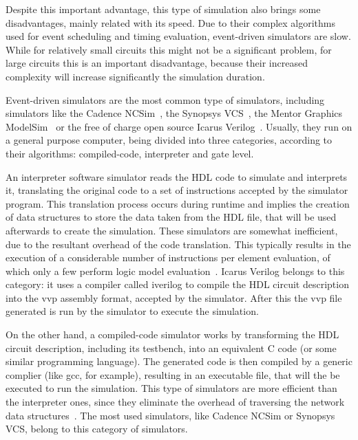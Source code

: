 Despite this important advantage, this type of simulation also brings some
disadvantages, mainly related with its speed. Due to their complex algorithms
used for event scheduling and timing evaluation, event-driven simulators are
slow. While for relatively small circuits this might not be a significant
problem, for large circuits this is an important disadvantage, because their
increased complexity will increase significantly the simulation duration.

Event-driven simulators are the most common type of simulators, including
simulators like the Cadence NCSim~\cite{cadence:ncsim}, the Synopsys
VCS~\cite{synopsys:vcs}, the Mentor Graphics ModelSim~\cite{mentor:modelsim} or
the free of charge open source Icarus Verilog~\cite{icarus:verilog}. Usually,
they run on a general purpose computer, being divided into three categories,
according to their algorithms: compiled-code, interpreter and gate level.

An interpreter software simulator reads the \ac{HDL} code to simulate and interprets
it, translating the original code to a set of instructions accepted by the
simulator program. This translation process occurs during runtime and implies
the creation of data structures to store the data taken from the \ac{HDL} file, that
will be used afterwards to create the simulation. These simulators are somewhat
inefficient, due to the resultant overhead of the code translation. This
typically results in the execution of a considerable number of instructions per
element evaluation, of which only a few perform logic model
evaluation~\cite{lewis:compiled}. Icarus Verilog belongs to this category: it uses a 
compiler called iverilog to compile the \ac{HDL} circuit description into the vvp 
assembly format, accepted by the simulator. After this the vvp file generated is run by 
the simulator to execute the simulation.

On the other hand, a compiled-code simulator works by transforming the \ac{HDL}
circuit description, including its testbench, into an equivalent C code (or some
similar programming language). The generated code is then compiled by a generic
complier (like gcc, for example), resulting in an executable file, that will the
be executed to run the simulation. This type of simulators are more efficient
than the interpreter ones, since they eliminate the overhead of traversing the
network data structures~\cite{lewis:compiled}. The most used simulators, like
Cadence NCSim or Synopsys VCS, belong to this category of simulators.

